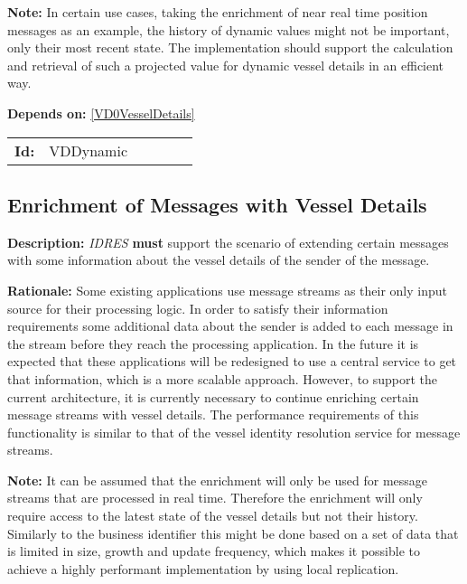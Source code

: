 \textbf{Note:} In certain use cases, taking the enrichment of near real time position  messages as an example, the history of dynamic values might not be important, only their most recent state. The implementation should support the calculation and retrieval of such a  projected value for dynamic vessel details in an efficient way.

\textbf{Depends on:} \ref{VD0VesselDetails} 

\par
{\small \begin{center}\begin{tabular}{rlrlrl}
\textbf{Id:} & VDDynamic  & & & \end{tabular}\end{center} }

\subsection{Enrichment of Messages with Vessel Details}\label{VDEnrichment}
\textbf{Description:} \textsl{IDRES} \textbf{must} support the scenario of extending certain messages with some information about the vessel details of  the sender of the message.

\textbf{Rationale:} Some existing applications use message streams as their only input source for their processing logic. In order to satisfy their information requirements some additional data about the sender is added  to each message in the stream before they reach the processing application.  In the future it is expected that these applications will be redesigned to use a central service to get that information, which is a more scalable  approach. However, to support the current architecture, it is currently necessary to continue enriching certain message streams with vessel details.  The performance requirements of this functionality is similar to that of the vessel identity resolution service for message streams.

\textbf{Note:} It can be assumed that the enrichment will only be used for message streams that are processed in real time. Therefore the enrichment will only require access to the latest state of the vessel details but not  their history. Similarly to the business identifier this might be  done based on a set of data that is limited in size, growth and update  frequency, which makes it possible to achieve a highly performant  implementation by using local replication.

